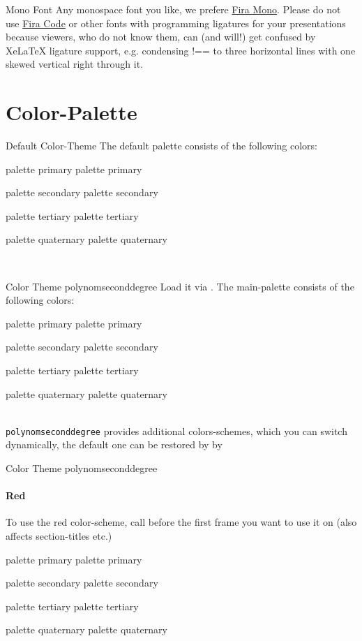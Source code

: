 \documentclass[fragile=singleslide]{beamer}
\begin{document}
\begin{frame}{Mono Font}
  Any monospace font you like, we prefere
  \href{https://mozilla.github.io/Fira/}{Fira Mono}. Please do not use
  \href{https://github.com/tonsky/FiraCode}{Fira Code} or other fonts with programming ligatures for your
  presentations because viewers, who do not know them, can (and will!)
  get confused by XeLaTeX ligature support, e.g. condensing !== to
  three horizontal lines with one skewed vertical right through it.
\end{frame}
 
\section{Color-Palette}

\newcommand{\clrbx}[1]{
  \begin{beamercolorbox}[wd=5em,ht=5ex,dp=1.125ex,center]{#1}
    \small#1
  \end{beamercolorbox}}
\newcommand{\paletteColors}{
  \clrbx{palette primary}
  \clrbx{palette secondary}
  \clrbx{palette tertiary}
  \clrbx{palette quaternary}}


\begin{frame}{Default Color-Theme}
  The default palette consists of the following colors:\\
  \paletteColors\\
\end{frame}



\begin{frame}{Color Theme polynomseconddegree}
  Load it via
  \texttt{}. The
  main-palette consists of the following colors:\\
  \paletteColors\\
  
  \texttt{polynomseconddegree} provides additional colors-schemes,
  which you can switch dynamically, the default one can be restored by by
  \texttt{\setPaletteBlue} 
\end{frame}

\setPaletteRed
\begin{frame}{Color Theme polynomseconddegree}
  \framesubtitle{Red}

  To use the red color-scheme, call \texttt{\setPaletteRed}
  before the first frame you want to use it on (also affects
  section-titles etc.) \\
  \paletteColors\\
  
\end{frame}
\end{document}
